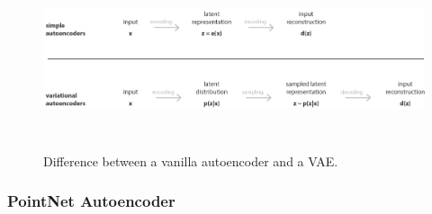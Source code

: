 \begin{figure}[t]
    \centering
    \includegraphics[width=400pt,height=150pt]{pictures/vae.png}
    \caption{Difference between a vanilla autoencoder and a \ac{VAE}.\cite{vae_image}}
    \label{fig:vae}
\end{figure} 
\subsubsection{PointNet Autoencoder}
